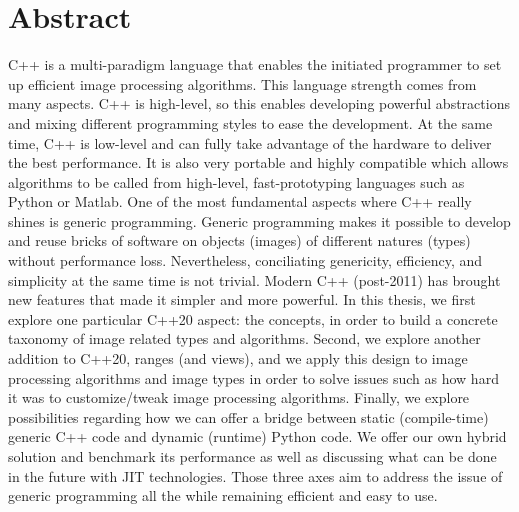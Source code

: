 \section*{Abstract}
\label{sec:abstract}
C++ is a multi-paradigm language that enables the initiated programmer to set up efficient image processing algorithms.
This language strength comes from many aspects. C++ is high-level, so this enables developing powerful abstractions and
mixing different programming styles to ease the development. At the same time, C++ is low-level and can fully take
advantage of the hardware to deliver the best performance. It is also very portable and highly compatible which allows
algorithms to be called from high-level, fast-prototyping languages such as Python or Matlab. One of the most
fundamental aspects where C++ really shines is generic programming. Generic programming makes it possible to develop and
reuse bricks of software on objects (images) of different natures (types) without performance loss. Nevertheless,
conciliating genericity, efficiency, and simplicity at the same time is not trivial. Modern C++ (post-2011) has brought
new features that made it simpler and more powerful. In this thesis, we first explore one particular C++20 aspect: the
concepts, in order to build a concrete taxonomy of image related types and algorithms. Second, we explore another
addition to C++20, ranges (and views), and we apply this design to image processing algorithms and image types in order
to solve issues such as how hard it was to customize/tweak image processing algorithms. Finally, we explore
possibilities regarding how we can offer a bridge between static (compile-time) generic C++ code and dynamic (runtime)
Python code. We offer our own hybrid solution and benchmark its performance as well as discussing what can be done in
the future with JIT technologies. Those three axes aim to address the issue of generic programming all the while
remaining efficient and easy to use.

\bigskip

\bigskip

